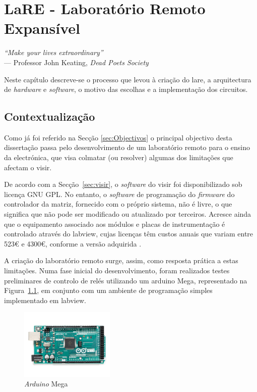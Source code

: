 \chapter{LaRE - Laboratório Remoto Expansível}
\label{Capítulo3}
\begin{flushright}
\textit{``Make your lives extraordinary''} \\[0.5em]
--- Professor John Keating, \textit{Dead Poets Society}
\end{flushright}

Neste capítulo descreve-se o processo que levou à criação do \acrshort{lare}, a arquitectura de \textit{hardware} e \textit{software}, o motivo das escolhas e a implementação dos circuitos.

\section{Contextualização}
\label{sec:contextualização}
Como já foi referido na Secção \ref{sec:Objectivos} o principal objectivo desta dissertação passa pelo desenvolvimento de um \acrshort{laboratório remoto} para o ensino da electrónica, que visa colmatar (ou resolver) algumas dos limitações que afectam o \acrshort{visir}.

De acordo com a Secção~\ref{sec:visir}, o \textit{software} do \acrshort{visir} foi disponibilizado sob licença GNU GPL. No entanto, o \textit{software} de programação do \textit{firmware} do controlador da matriz, fornecido com o próprio sistema, não é livre, o que significa que não pode ser modificado ou atualizado por terceiros. Acresce ainda que o equipamento associado aos módulos e placas de instrumentação é controlado através do \acrshort{labview}, cujas licenças têm custos anuais que variam entre 523€ e 4300€, conforme a versão adquirida \cite{labviewpricing}.

A criação do \acrshort{laboratório remoto} surge, assim, como resposta prática a estas limitações. Numa fase inicial do desenvolvimento, foram realizados testes preliminares de controlo de relés utilizando um \gls{arduino} Mega, representado na Figura~\ref{fig:arduinomega}, em conjunto com um ambiente de programação simples implementado em \acrshort{labview}.

\begin{figure}[hbtp]
    \centering
    \includegraphics[width=0.4\textwidth]{figures/arduinomega.png}
    \caption{\textit{Arduino} Mega \cite{ArduinoMega}}
    \label{fig:arduinomega}
\end{figure}

